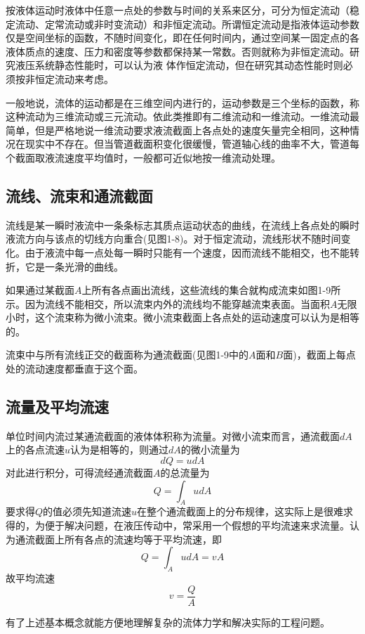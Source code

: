 按液体运动时液体中任意一点处的参数与时间的关系来区分，可分为恒定流动（稳定流动、定常流动或非时变流动）和非恒定流动。所谓恒定流动是指液体运动参数仅是空间坐标的函数，不随时间变化，即在任何时间内，通过空间某一固定点的各液体质点的速度、压力和密度等参数都保持某一常数。否则就称为非恒定流动。研究液压系统静态性能时，可以认为液 体作恒定流动，但在研究其动态性能时则必须按非恒定流动来考虑。

一般地说，流体的运动都是在三维空间内进行的，运动参数是三个坐标的函数，称这种流动为三维流动或三元流动。依此类推即有二维流动和一维流动。一维流动最简单，但是严格地说一维流动要求液流截面上各点处的速度矢量完全相同，这种情况在现实中不存在。但当管道截面积变化很缓慢，管道轴心线的曲率不大，管道每个截面取液流速度平均值时，一般都可近似地按一维流动处理。
\subsection{流线、流束和通流截面}
流线是某一瞬时液流中一条条标志其质点运动状态的曲线，在流线上各点处的瞬时液流方向与该点的切线方向重合(见图1-8)。对于恒定流动，流线形状不随时间变化。由于液流中每一点处每一瞬时只能有一个速度，因而流线不能相交，也不能转折，它是一条光滑的曲线。

如果通过某截面$A$上所有各点画出流线，这些流线的集合就构成流束如图1-9所示。因为流线不能相交，所以流束内外的流线均不能穿越流束表面。当面积$A$无限小时，这个流束称为微小流束。微小流束截面上各点处的运动速度可以认为是相等的。

流束中与所有流线正交的截面称为通流截面(见图1-9中的$A$面和$B$面)，截面上每点处的流动速度都垂直于这个面。

\subsection{流量及平均流速}
单位时间内流过某通流截面的液体体积称为流量。对微小流束而言，通流截面$dA$上的各点流速$u$认为是相等的，则通过$dA$的微小流量为
$$dQ=udA$$
对此进行积分，可得流经通流截面$A$的总流量为
$$Q=\int_{A}^{}  udA$$
要求得$Q$的值必须先知道流速$u$在整个通流截面上的分布规律，这实际上是很难求得的，为便于解决问题，在液压传动中，常采用一个假想的平均流速来求流量。认为通流截面上所有各点的流速均等于平均流速，即
\begin{equation}
Q=\int_{A}^{}  udA=vA
\end{equation}
故平均流速
\begin{equation}
 v=\frac{Q}{A}
\end{equation}

有了上述基本概念就能方便地理解复杂的流体力学和解决实际的工程问题。
